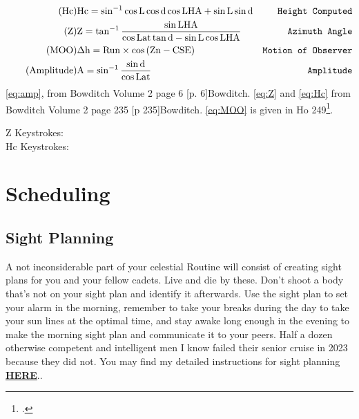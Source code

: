 \documentclass[letterpaper,12pt]{article}
\begin{document}
\begin{align}
	\label{eq:Hc}\tag{Hc}	&\text{Hc}=\sin^{-1}{\cos{\text{L}}\cos{\text{d}}\cos{\text{LHA}}+\sin{\text{L}}\sin{\text{d}}}  &
	\text{\texttt{Height Computed}}\\
	\label{eq:Z}\tag{Z}	   &\text{Z}=\tan^{-1}{\frac{\sin{\text{LHA}}}{\cos{\text{Lat}\tan\text{{d}}-\sin{\text{L}}\cos{\text{LHA}}}}}   &\text{\texttt{Azimuth Angle}}\\
   \label{eq:MOO}\tag{MOO} &\Delta\text{h}=\text{Run}\times\cos{(\text{Zn}-\text{CSE})}  &\text{\texttt{Motion of Observer}}\\
  \label{eq:amp}\tag{Amplitude}&\text{A}=\sin^{-1}\frac{\sin{\text{d}}}{\cos{\text{Lat}}}	&\text{\texttt{Amplitude}}
\end{align}
\ref{eq:amp}, from Bowditch Volume 2 page 6 [p. 6]{Bowditch}.
\ref{eq:Z} and \ref{eq:Hc} from Bowditch Volume 2 page 235 [p 235]{Bowditch}.
\ref{eq:MOO} is given in Ho 249\footcite{ho249}.

\noindent Z Keystrokes: \keystroke{\textdiv}\keystroke{(}\keystroke{\texttimes}\keystroke{\textminus}\keystroke{\texttimes}\keystroke{)}\keystroke{=}\\
\noindent Hc Keystrokes: \keystroke{\texttimes}\keystroke{\texttimes}\keystroke{+}\keystroke{\texttimes}\keystroke{=}
\section{Scheduling}
\subsection{Sight Planning}
A not inconsiderable part of your celestial Routine will consist of creating sight plans for you and your fellow cadets.
 Live and die by these.
 Don't shoot a body that's not on your sight plan and identify it afterwards.
 Use the sight plan to set your alarm in the morning, remember to take your breaks during the day to take your sun lines at the optimal time, and stay awake long enough in the evening to make the morning sight plan and communicate it to your peers.
 Half a dozen otherwise competent and intelligent men I know failed their senior cruise in 2023 because they did not.
 You may find my detailed instructions for sight planning \hyperlink{https://www.csum.edu/tutoring/media/celnavjoey.pdf}{\textbf{HERE}}..
\end{document}
